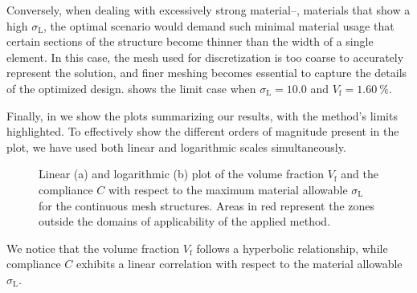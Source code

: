 Conversely, when dealing with excessively strong material--\ie, materials that show a high $\sigma_\text{L}$, the optimal scenario would demand such minimal material usage that certain sections of the structure become thinner than the width of a single element. In this case, the mesh used for discretization is too coarse to accurately represent the solution, and finer meshing becomes essential to capture the details of the optimized design.  shows
the limit case when $\sigma_\text{L}=10.0$ and $V_\text{f}=\qty{1.60}{\percent}$.

Finally, in  we show the plots summarizing our results, with the method's limits highlighted. To effectively show the different orders of magnitude present in the plot, we have used both linear and logarithmic scales simultaneously.
\begin{figure}
    \hspace*{\fill}
    \hfill
    \hspace*{\fill}
    \caption{Linear (a) and logarithmic (b) plot of the volume fraction $V_\text{f}$ and the compliance $C$ with respect to the maximum material allowable $\sigma_\text{L}$ for the continuous mesh structures. Areas in red represent the zones outside the domains of applicability of the applied method.}
    \label{fig:03_to_plot}
\end{figure}
We notice that the volume fraction $V_\text{f}$ follows a hyperbolic relationship, while compliance $C$ exhibits a linear correlation with respect to the material allowable $\sigma_\text{L}$.

